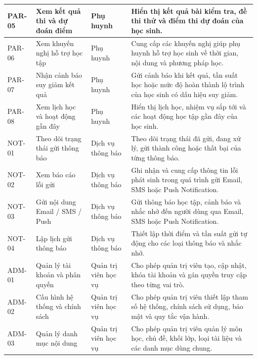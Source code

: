 \begin{longtable}{|p{}|p{}|p{}|p{}|}
PAR-05 &
Xem kết quả thi và dự đoán điểm &
Phụ huynh &
Hiển thị kết quả bài kiểm tra, đề thi thử và điểm thi dự đoán của học sinh. \\
\hline

PAR-06 &
Xem khuyến nghị hỗ trợ học tập &
Phụ huynh &
Cung cấp các khuyến nghị giúp phụ huynh hỗ trợ học sinh về thời gian, nội dung và phương pháp học. \\
\hline

PAR-07 &
Nhận cảnh báo suy giảm kết quả &
Phụ huynh &
Gửi cảnh báo khi kết quả, tần suất học hoặc mức độ hoàn thành lộ trình của học sinh có dấu hiệu suy giảm. \\
\hline

PAR-08 &
Xem lịch học và hoạt động gần đây &
Phụ huynh &
Hiển thị lịch học, nhiệm vụ sắp tới và các hoạt động học tập gần đây của học sinh. \\
\hline

NOT-01 &
Theo dõi trạng thái gửi thông báo &
Dịch vụ thông báo &
Theo dõi trạng thái đã gửi, đang xử lý, gửi thành công hoặc thất bại của từng thông báo. \\
\hline

NOT-02 &
Xem báo cáo lỗi gửi &
Dịch vụ thông báo &
Ghi nhận và cung cấp thông tin lỗi phát sinh trong quá trình gửi Email, SMS hoặc Push Notification. \\
\hline

NOT-03 &
Gửi nội dung Email / SMS / Push &
Dịch vụ thông báo &
Gửi thông báo học tập, cảnh báo và nhắc nhở đến người dùng qua Email, SMS hoặc Push Notification. \\
\hline

NOT-04 &
Lập lịch gửi thông báo &
Dịch vụ thông báo &
Thiết lập thời điểm và tần suất gửi tự động cho các loại thông báo và nhắc nhở. \\
\hline

ADM-01 &
Quản lý tài khoản và phân quyền &
Quản trị viên học vụ &
Cho phép quản trị viên tạo, cập nhật, khóa tài khoản và gán quyền truy cập theo từng vai trò. \\
\hline

ADM-02 &
Cấu hình hệ thống và chính sách &
Quản trị viên học vụ &
Cho phép quản trị viên thiết lập tham số hệ thống, chính sách sử dụng, bảo mật và quy tắc vận hành. \\
\hline

ADM-03 &
Quản lý danh mục nội dung &
Quản trị viên học vụ &
Cho phép quản trị viên quản lý môn học, chủ đề, khối lớp, loại tài liệu và các danh mục dùng chung. \\
\hline


\end{longtable}
